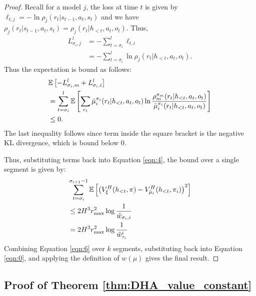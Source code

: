 \begin{proof}
    Recall for a model $j$, the loss at time $t$ is given by $\ell_{t, j} = - \ln \rho_j(r_t | s_{t-1}, a_t, s_t)$ and we have $\rho_j(r_t | s_{t-1}, a_t, s_t) = \rho_j(r_t | h_{<t}, a_t, o_t)$. Thus,
    \begin{align*}
        L_{\sigma_i, j}^{l} &= - \sum_{t = \sigma_i}^{l} \ell_{t, i} \\
        &= - \sum_{t = \sigma_i}^{l} \ln \rho_j(r_t | h_{<t}, a_t, o_t).
    \end{align*}
    Thus the expectation is bound as follows:
    \begin{equation}
    \begin{split}
        &\mathbb{E} \left[ - L_{\sigma_i, m}^{l} + L_{\sigma_i, i}^{l}\right] \\
        &= \sum_{t = \sigma_i}^{l} \mathbb{E}\left[ \sum_{r_t} \bar{\mu}_i^{\pi_i}(r_t | h_{<t}, a_t, o_t) \ln \frac{ \rho^{\pi_m}_{m}(r_t | h_{<t}, a_t, o_t) }{ \bar{\mu}_i^{\pi_i}(r_t | h_{<t}, a_t, o_t) } \right]\\
        &\leq 0.
    \end{split}
    \end{equation}
    The last inequality follows since term inside the square bracket is the negative KL divergence, which is bound below 0. 

    Thus, substituting terms back into Equation \ref{eqn:4}, the bound over a single segment is given by:
    \begin{equation}
    \begin{split}
        &\sum_{t=\sigma_i}^{\sigma_{i+1}-1} \mathbb{E} \left[ \left( V_{\xi}^{H}(h_{<t}, \pi) - V_{\bar{\mu}_i}^{H}(h_{<t}, \pi_i) \right)^2 \right] \\
        &\leq 2 H^3 r_{\max}^2 \log \frac{1}{\hat{w}_{\sigma_i, i}} \\
        &= 2 H^3 r_{\max}^2 \log \frac{1}{\hat{w}_{\tau_i}^{i}} \label{eqn:6}
    \end{split}
    \end{equation}
    Combining Equation \ref{eqn:6} over $k$ segments, substituting back into Equation \ref{eqn:0}, and applying the definition of $w(\mu)$ gives the final result.    
\end{proof}


\subsection{Proof of Theorem \ref{thm:DHA_value_constant}}

